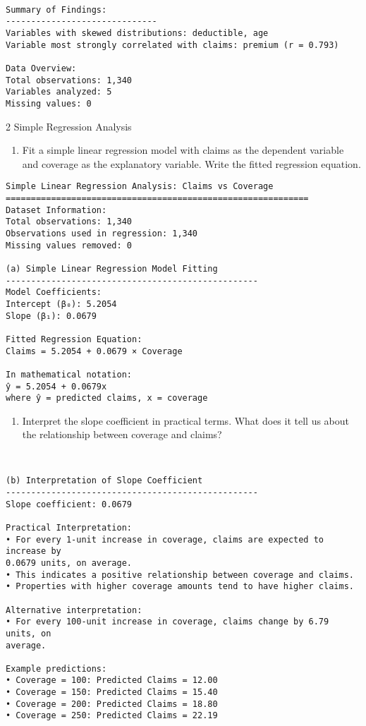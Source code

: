 \documentclass[8pt, twocolumn]{extarticle}
\providecommand{\tightlist}{%
      \setlength{\itemsep}{0pt}\setlength{\parskip}{0pt}}
\begin{document}
    \begin{Verbatim}[commandchars=\\\{\}]

Summary of Findings:
------------------------------
Variables with skewed distributions: deductible, age
Variable most strongly correlated with claims: premium (r = 0.793)

Data Overview:
Total observations: 1,340
Variables analyzed: 5
Missing values: 0
    \end{Verbatim}

    2 Simple Regression Analysis

    \begin{enumerate}
\def\labelenumi{(\alph{enumi})}
\tightlist
\item
  Fit a simple linear regression model with claims as the dependent
  variable and coverage as the explanatory variable. Write the fitted
  regression equation.
\end{enumerate}

    \begin{Verbatim}[commandchars=\\\{\}]
Simple Linear Regression Analysis: Claims vs Coverage
============================================================
Dataset Information:
Total observations: 1,340
Observations used in regression: 1,340
Missing values removed: 0

(a) Simple Linear Regression Model Fitting
--------------------------------------------------
Model Coefficients:
Intercept (β₀): 5.2054
Slope (β₁): 0.0679

Fitted Regression Equation:
Claims = 5.2054 + 0.0679 × Coverage

In mathematical notation:
ŷ = 5.2054 + 0.0679x
where ŷ = predicted claims, x = coverage
    \end{Verbatim}

    \begin{enumerate}
\def\labelenumi{(\alph{enumi})}
\setcounter{enumi}{1}
\tightlist
\item
  Interpret the slope coefficient in practical terms. What does it tell
  us about the relationship between coverage and claims?
\end{enumerate}

    \begin{Verbatim}[commandchars=\\\{\}]


(b) Interpretation of Slope Coefficient
--------------------------------------------------
Slope coefficient: 0.0679

Practical Interpretation:
• For every 1-unit increase in coverage, claims are expected to increase by
0.0679 units, on average.
• This indicates a positive relationship between coverage and claims.
• Properties with higher coverage amounts tend to have higher claims.

Alternative interpretation:
• For every 100-unit increase in coverage, claims change by 6.79 units, on
average.

Example predictions:
• Coverage = 100: Predicted Claims = 12.00
• Coverage = 150: Predicted Claims = 15.40
• Coverage = 200: Predicted Claims = 18.80
• Coverage = 250: Predicted Claims = 22.19
    \end{Verbatim}
\end{document}
